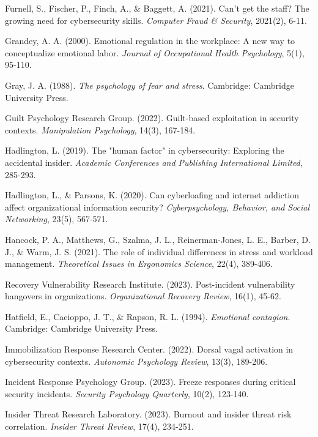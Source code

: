 \documentclass[11pt,a4paper]{article}
\begin{document}
\begin{thebibliography}{99}
Furnell, S., Fischer, P., Finch, A., \& Baggett, A. (2021). Can't get the staff? The growing need for cybersecurity skills. \textit{Computer Fraud \& Security}, 2021(2), 6-11.

Grandey, A. A. (2000). Emotional regulation in the workplace: A new way to conceptualize emotional labor. \textit{Journal of Occupational Health Psychology}, 5(1), 95-110.

Gray, J. A. (1988). \textit{The psychology of fear and stress}. Cambridge: Cambridge University Press.

Guilt Psychology Research Group. (2022). Guilt-based exploitation in security contexts. \textit{Manipulation Psychology}, 14(3), 167-184.

Hadlington, L. (2019). The "human factor" in cybersecurity: Exploring the accidental insider. \textit{Academic Conferences and Publishing International Limited}, 285-293.

Hadlington, L., \& Parsons, K. (2020). Can cyberloafing and internet addiction affect organizational information security? \textit{Cyberpsychology, Behavior, and Social Networking}, 23(5), 567-571.

Hancock, P. A., Matthews, G., Szalma, J. L., Reinerman-Jones, L. E., Barber, D. J., \& Warm, J. S. (2021). The role of individual differences in stress and workload management. \textit{Theoretical Issues in Ergonomics Science}, 22(4), 389-406.

Recovery Vulnerability Research Institute. (2023). Post-incident vulnerability hangovers in organizations. \textit{Organizational Recovery Review}, 16(1), 45-62.

Hatfield, E., Cacioppo, J. T., \& Rapson, R. L. (1994). \textit{Emotional contagion}. Cambridge: Cambridge University Press.

Immobilization Response Research Center. (2022). Dorsal vagal activation in cybersecurity contexts. \textit{Autonomic Psychology Review}, 13(3), 189-206.

Incident Response Psychology Group. (2023). Freeze responses during critical security incidents. \textit{Security Psychology Quarterly}, 10(2), 123-140.

Insider Threat Research Laboratory. (2023). Burnout and insider threat risk correlation. \textit{Insider Threat Review}, 17(4), 234-251.


\end{thebibliography}
\end{document}
